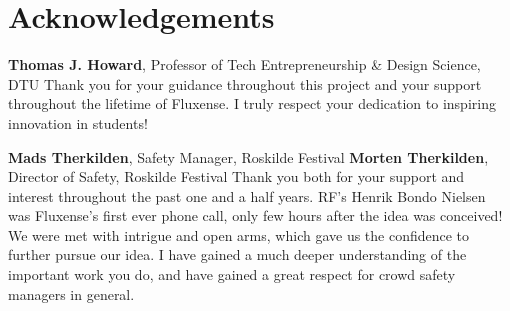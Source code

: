 \section*{Acknowledgements}

\textbf{Thomas J. Howard}, Professor of Tech Entrepreneurship \& Design Science, DTU \newline
Thank you for your guidance throughout this project and your support throughout the lifetime of Fluxense. I truly respect your dedication to inspiring innovation in students!

\textbf{Mads Therkilden}, Safety Manager, Roskilde Festival \newline
\textbf{Morten Therkilden}, Director of Safety, Roskilde Festival \newline
Thank you both for your support and interest throughout the past one and a half years. RF's Henrik Bondo Nielsen was Fluxense's first ever phone call, only few hours after the idea was conceived! We were met with intrigue and open arms, which gave us the confidence to further pursue our idea. I have gained a much deeper understanding of the important work you do, and have gained a great respect for crowd safety managers in general.